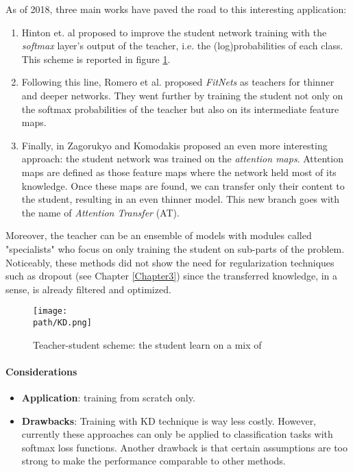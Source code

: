 As of 2018, three main works have paved the road to this interesting application: 
\begin{enumerate}
    \item Hinton et. al \parencite{hinton-KD} proposed to improve the student network training with the \emph{softmax} layer's output of the teacher, i.e. the (log)probabilities of each class. This scheme is reported in figure \ref{fig:KD}.
    
    \item Following this line, Romero et al. \parencite{romero-KD} proposed \textit{FitNets} as teachers for thinner and deeper networks. They went further by training the student not only on the softmax probabilities of the teacher but also on its intermediate feature maps.
    
    \item Finally, in \parencite{greci-KD} Zagorukyo and Komodakis proposed an even more interesting approach: the student network was trained on the \emph{attention maps}. Attention  maps are defined as those feature maps where the network held most of its knowledge. Once these maps are found, we can transfer only their content to the student, resulting in an even thinner model. This new branch goes with the name of \emph{Attention Transfer} (AT).
\end{enumerate}

Moreover, the teacher can be an ensemble of models \parencite{Wensemble} with modules called "specialists" who focus on only training the student on sub-parts of the problem. 
Noticeably, these methods did not show the need for regularization techniques such as dropout (see Chapter \ref{Chapter3}) since the transferred knowledge, in a sense, is already filtered and optimized. 


\begin{figure}[h!]
 \centering
 \texttt{[image: \\path/KD.png]} 
 \caption{Teacher-student scheme: the student learn on a mix of }
 \label{fig:KD}
\end{figure}


\paragraph{Considerations}
\begin{itemize}
    \item \textbf{Application}: training from scratch only.
    
    \item \textbf{Drawbacks}: 
Training with KD technique is way less costly. However, currently these approaches can only be applied to classification tasks with softmax loss functions. Another drawback is that certain assumptions are too strong to make the performance comparable to other methods.
\end{itemize}




